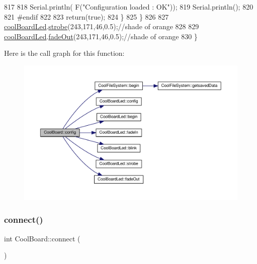 \begin{DoxyCode}
817 
818                 Serial.println( F(\textcolor{stringliteral}{"Configuration loaded : OK"}));
819                 Serial.println();
820 
821 \textcolor{preprocessor}{            #endif}
822 
823             \textcolor{keywordflow}{return}(\textcolor{keyword}{true});
824         \}
825     \}
826 
827     \hyperlink{class_cool_board_a1b1d3c684a5baa56b08486e192fd8e97}{coolBoardLed}.\hyperlink{class_cool_board_led_ad5f0de4c628cbfbf49896042831c64ad}{strobe}(243,171,46,0.5);\textcolor{comment}{//shade of orange}
828     
829     \hyperlink{class_cool_board_a1b1d3c684a5baa56b08486e192fd8e97}{coolBoardLed}.\hyperlink{class_cool_board_led_a93d545679237e8cc858324367149775c}{fadeOut}(243,171,46,0.5);\textcolor{comment}{//shade of orange               }
830 \}
\end{DoxyCode}
Here is the call graph for this function\+:\nopagebreak
\begin{figure}[H]
\begin{center}
\leavevmode
\includegraphics[width=350pt]{d7/df9/class_cool_board_a583a874c09c07e70a6eb9229fc4beddb_cgraph}
\end{center}
\end{figure}
\mbox{\label{class_cool_board_a519de78b807f8ec6463ff484eb925918}} 
\subsubsection{\texorpdfstring{connect()}{connect()}}
{\footnotesize\ttfamily int Cool\+Board\+::connect (\begin{DoxyParamCaption}{ }\end{DoxyParamCaption})}


